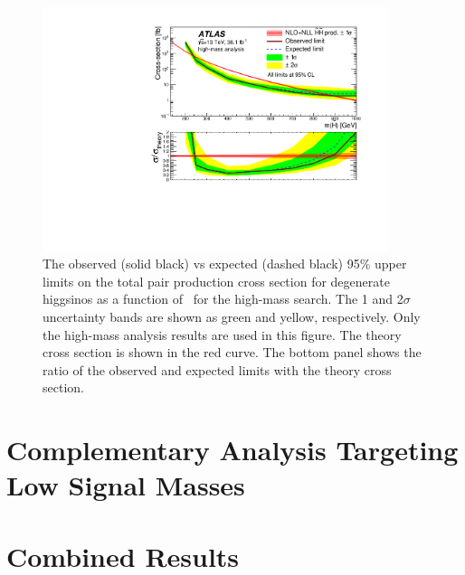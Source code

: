 \begin{figure}[htbp]
	\centering
	\includegraphics[width=0.9\textwidth]{figures/ewk_prod/interpretation/limit_HM}
	\caption{The observed (solid black) vs expected (dashed black) 95\% upper limits on the total pair production cross section for degenerate higgsinos as a function of \mhino\ for the high-mass search. The 1 and 2$\sigma$ uncertainty bands are shown as green and yellow, respectively. Only the high-mass analysis results are used in this figure. The theory cross section is shown in the red curve. The bottom panel shows the ratio of the observed and expected limits with the theory cross section.} 
	\label{fig:exclusion_high}
\end{figure}


\section{Complementary Analysis Targeting Low Signal Masses}


\section{Combined Results}

